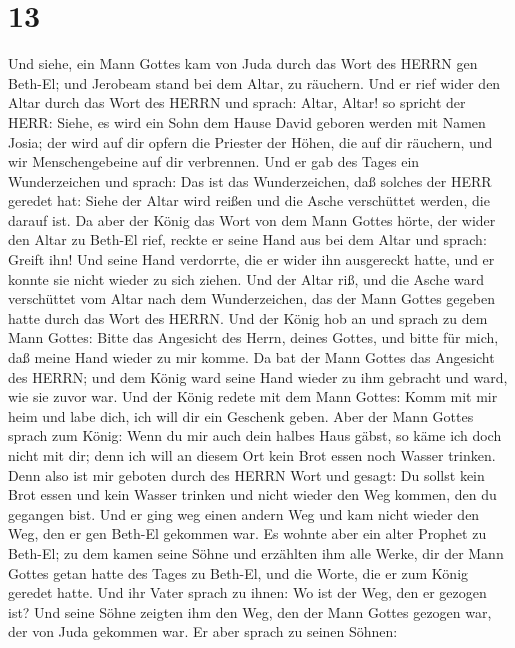 \hypertarget{section-12}{%
\section{13}\label{section-12}}

 Und siehe, ein Mann Gottes kam von Juda durch das Wort des
HERRN gen Beth-El; und Jerobeam stand bei dem Altar, zu räuchern.
 Und er rief wider den Altar durch das Wort des HERRN und
sprach: Altar, Altar! so spricht der HERR: Siehe, es wird ein Sohn dem
Hause David geboren werden mit Namen Josia; der wird auf dir opfern die
Priester der Höhen, die auf dir räuchern, und wir Menschengebeine auf
dir verbrennen.  Und er gab des Tages ein Wunderzeichen und
sprach: Das ist das Wunderzeichen, daß solches der HERR geredet hat:
Siehe der Altar wird reißen und die Asche verschüttet werden, die darauf
ist.  Da aber der König das Wort von dem Mann Gottes hörte,
der wider den Altar zu Beth-El rief, reckte er seine Hand aus bei dem
Altar und sprach: Greift ihn! Und seine Hand verdorrte, die er wider ihn
ausgereckt hatte, und er konnte sie nicht wieder zu sich ziehen.
 Und der Altar riß, und die Asche ward verschüttet vom Altar
nach dem Wunderzeichen, das der Mann Gottes gegeben hatte durch das Wort
des HERRN.  Und der König hob an und sprach zu dem Mann
Gottes: Bitte das Angesicht des Herrn, deines Gottes, und bitte für
mich, daß meine Hand wieder zu mir komme. Da bat der Mann Gottes das
Angesicht des HERRN; und dem König ward seine Hand wieder zu ihm
gebracht und ward, wie sie zuvor war.  Und der König redete
mit dem Mann Gottes: Komm mit mir heim und labe dich, ich will dir ein
Geschenk geben.  Aber der Mann Gottes sprach zum König: Wenn
du mir auch dein halbes Haus gäbst, so käme ich doch nicht mit dir; denn
ich will an diesem Ort kein Brot essen noch Wasser trinken. 
Denn also ist mir geboten durch des HERRN Wort und gesagt: Du sollst
kein Brot essen und kein Wasser trinken und nicht wieder den Weg kommen,
den du gegangen bist.  Und er ging weg einen andern Weg und
kam nicht wieder den Weg, den er gen Beth-El gekommen war. 
Es wohnte aber ein alter Prophet zu Beth-El; zu dem kamen seine Söhne
und erzählten ihm alle Werke, dir der Mann Gottes getan hatte des Tages
zu Beth-El, und die Worte, die er zum König geredet hatte. 
Und ihr Vater sprach zu ihnen: Wo ist der Weg, den er gezogen ist? Und
seine Söhne zeigten ihm den Weg, den der Mann Gottes gezogen war, der
von Juda gekommen war.  Er aber sprach zu seinen Söhnen:
